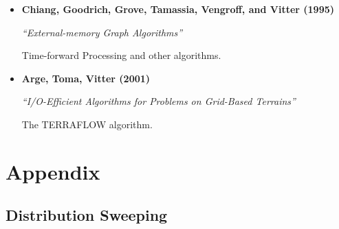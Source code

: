 \documentclass[english, aspectratio=169]{beamer}
\begin{document}
\begin{frame}[t]
{\begin{itemize}
      \emph{``External-Memory Computational Geometry''}

      {\color{gray}\normalsize Distribution Sweeping and other algorithms.}

    \item \textbf{Chiang, Goodrich, Grove, Tamassia, Vengroff, and Vitter (1995)}

      \emph{``External-memory Graph Algorithms''}

      {\color{gray}\normalsize Time-forward Processing and other algorithms.}

    \item \textbf{Arge, Toma, Vitter (2001)}

      \emph{``I/O-Efficient Algorithms for Problems on Grid-Based Terrains''}

      {\color{gray}\normalsize The T{\footnotesize ERRA}F{\footnotesize LOW} algorithm.}
    \end{itemize}
  }
\end{frame}



\blankframe

\section{Appendix}

\subsection{Distribution Sweeping}
\end{document}
